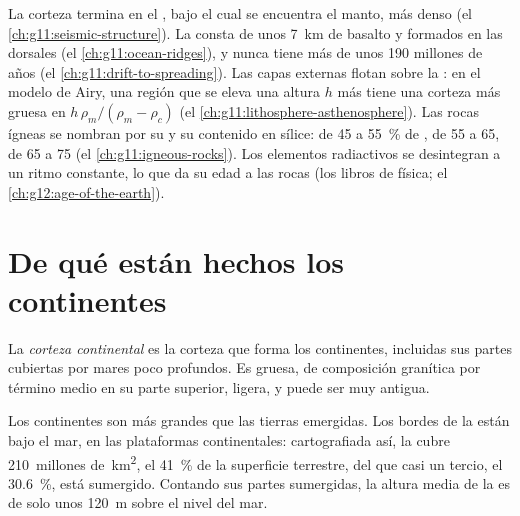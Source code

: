 \begin{recall}
La corteza termina en el , bajo el cual se encuentra el manto, más denso
(el \cref{ch:g11:seismic-structure}). La  consta de unos
\qty{7}{km} de basalto y  formados en las dorsales (el
\cref{ch:g11:ocean-ridges}), y nunca tiene más de unos 190 millones de años
(el \cref{ch:g11:drift-to-spreading}). Las capas externas flotan sobre la
: en el modelo de Airy, una región que se eleva una altura $h$ más
tiene una corteza más gruesa en $h\,\rho_m/(\rho_m -
\rho_c)$ (el \cref{ch:g11:lithosphere-asthenosphere}). Las rocas ígneas se
nombran por su  y su contenido en sílice:  de 45 a
\qty{55}{\percent} de ,  de 55 a 65,  de 65 a
75 (el \cref{ch:g11:igneous-rocks}). Los elementos radiactivos se desintegran
a un ritmo constante, lo que da su edad a las rocas (los libros de física;
el \cref{ch:g12:age-of-the-earth}).
\end{recall}

\section{De qué están hechos los continentes}

\begin{definition}\label{def:g12:continental-crust:continental-crust}
La \emph{corteza continental} es la corteza que
forma los continentes, incluidas sus partes cubiertas por mares poco
profundos. Es gruesa, de composición granítica por término medio en su parte
superior, ligera, y puede ser muy antigua.
\end{definition}

Los continentes son más grandes que las tierras emergidas. Los bordes de la
 están bajo el mar, en las plataformas continentales:
cartografiada así, la  cubre \num{210}~millones de~\unit{km^2},
el \qty{41}{\percent} de la superficie terrestre, del que casi un tercio, el
\qty{30.6}{\percent}, está sumergido. Contando sus partes sumergidas, la altura
media de la  es de solo unos \qty{120}{m} sobre el nivel
del mar.

